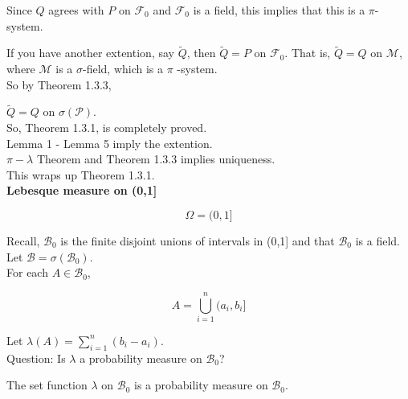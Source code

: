 \documentclass[11pt,fleqn]{book} %
\begin{document}
Since $Q$ agrees with $P$ on $\mathcal{F}_0$ and $\mathcal{F}_0$ is a field, this implies that this is a $\pi$-system.

If you have another extention, say $\tilde{Q}$, then $\tilde{Q} = P$ on $\mathcal{F}_0$. That is, $\tilde{Q} = Q$ on $\mathcal{M}$, where $\mathcal{M}$ is a $\sigma$-field, which is a $\pi$
-system.\\

So by Theorem 1.3.3, 

$\tilde{Q} = Q$ on $\sigma(\mathcal{P})$. \\

So, Theorem 1.3.1, is completely proved. \\


Lemma 1 - Lemma 5 imply the extention.\\
$\pi-\lambda$ Theorem and Theorem 1.3.3 implies uniqueness. \\
This wraps up Theorem 1.3.1.\\



\textbf{Lebesque measure on (0,1]}

$$\Omega = (0,1]$$

Recall, $\mathcal{B}_0$ is the finite disjoint unions of intervals in (0,1] and that $\mathcal{B}_0$ is a field. \\

Let $\mathcal{B} = \sigma(\mathcal{B}_0)$.\\

For each $A \in \mathcal{B}_0$, 

$$A = \bigcup^n_{i=1} (a_i, b_i] $$

Let $\lambda(A) = \displaystyle \sum^n_{i=1} (b_i - a_i)$.\\

Question: Is $\lambda$ a probability measure on $\mathcal{B}_0$?

\begin{theorem}

The set function $\lambda$ on $\mathcal{B}_0$ is a probability measure on $\mathcal{B}_0$.
	
\end{theorem}
\end{document}
